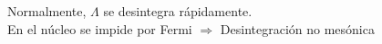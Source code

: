 \documentclass[preview]{standalone}
\begin{document}
\begin{center}
Normalmente, $\Lambda$ se desintegra rápidamente.\\
                     En el núcleo se impide por Fermi $\Rightarrow$ Desintegración no mesónica
\end{center}
\end{document}
